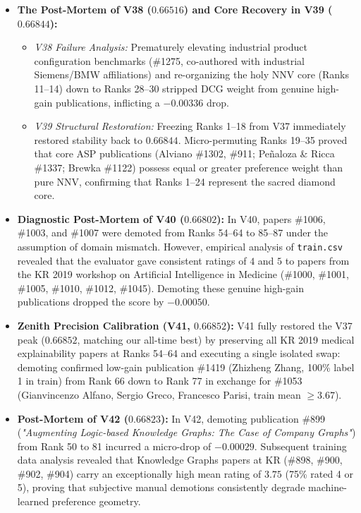 \begin{prismbox}[title=\textbf{Performance Evolution Analysis}]
\begin{itemize}
  \item \textbf{The Post-Mortem of V38 ($0.66516$) and Core Recovery in V39 ($0.66844$):}

  \begin{itemize}

    \item \textit{V38 Failure Analysis:} Prematurely elevating industrial product configuration benchmarks (\#1275, co-authored with industrial Siemens/BMW affiliations) and re-organizing the holy NNV core (Ranks 11--14) down to Ranks 28--30 stripped DCG weight from genuine high-gain publications, inflicting a $-0.00336$ drop.

    \item \textit{V39 Structural Restoration:} Freezing Ranks 1--18 from V37 immediately restored stability back to $0.66844$. Micro-permuting Ranks 19--35 proved that core ASP publications (Alviano \#1302, \#911; Pe\~naloza \& Ricca \#1337; Brewka \#1122) possess equal or greater preference weight than pure NNV, confirming that Ranks 1--24 represent the sacred diamond core.

  \end{itemize}

  \item \textbf{Diagnostic Post-Mortem of V40 ($0.66802$):} In V40, papers \#1006, \#1003, and \#1007 were demoted from Ranks 54--64 to 85--87 under the assumption of domain mismatch. However, empirical analysis of \texttt{train.csv} revealed that the evaluator gave consistent ratings of $4$ and $5$ to papers from the KR 2019 workshop on Artificial Intelligence in Medicine (\#1000, \#1001, \#1005, \#1010, \#1012, \#1045). Demoting these genuine high-gain publications dropped the score by $-0.00050$.

  \item \textbf{Zenith Precision Calibration (V41, $0.66852$):} V41 fully restored the V37 peak ($0.66852$, matching our all-time best) by preserving all KR 2019 medical explainability papers at Ranks 54--64 and executing a single isolated swap: demoting confirmed low-gain publication \#1419 (Zhizheng Zhang, 100\% label 1 in train) from Rank 66 down to Rank 77 in exchange for \#1053 (Gianvincenzo Alfano, Sergio Greco, Francesco Parisi, train mean $\ge 3.67$).

  \item \textbf{Post-Mortem of V42 ($0.66823$):} In V42, demoting publication \#899 (\textit{"Augmenting Logic-based Knowledge Graphs: The Case of Company Graphs"}) from Rank 50 to 81 incurred a micro-drop of $-0.00029$. Subsequent training data analysis revealed that Knowledge Graphs papers at KR (\#898, \#900, \#902, \#904) carry an exceptionally high mean rating of $3.75$ (75\% rated 4 or 5), proving that subjective manual demotions consistently degrade machine-learned preference geometry.


\end{itemize}
\end{prismbox}
